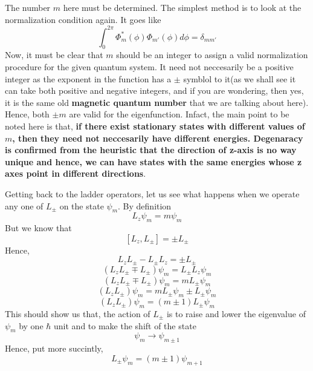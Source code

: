 \documentclass[12pt]{article}
\begin{document}
The number $m$ here must be determined. The simplest method is to look at the normalization condition again. It goes like $$\int_0^{2\pi} \Phi_m^*(\phi)\Phi_{m'}(\phi) d\phi = \delta_{mm'}$$ Now, it must be clear that $m$ should be an integer to assign a valid normalization procedure for the given quantum system. It need not neccesarily be a positive integer as the exponent in the function has a $\pm$ symblol to it(as we shall see it can take both positive and negative integers, and if you are wondering, then yes, it is the same old \textbf{magnetic quantum number} that we are talking about here). Hence, both $\pm m$ are valid for the eigenfunction. Infact, the main point to be noted here is that, \textbf{if there exist stationary states with different values of $m$, then they need not neccesarily have different energies. Degenaracy is confirmed from the heuristic that the direction of z-axis is no way unique and hence, we can have states with the same energies whose z axes point in different directions}.

Getting back to the ladder operators, let us see what happens when we operate any one of $L_{\pm}$ on the state $\psi_m$. By definition $$L_z\psi_m = m\psi_m$$ But we know that $$[L_z, L_{\pm}] = \pm L_{\pm}$$ Hence,
$$L_zL_{\pm} - L_{\pm}L_z = \pm L_{\pm}$$
$$(L_zL_{\pm} \mp L_{\pm})\psi_m = L_{\pm}L_z\psi_m$$ 
$$(L_zL_{\pm} \mp L_{\pm})\psi_m = mL_{\pm}\psi_m$$
$$(L_zL_{\pm})\psi_m  = mL_{\pm}\psi_m\pm L_{\pm}\psi_m$$
$$(L_zL_{\pm})\psi_m = (m \pm 1)L_{\pm}\psi_m$$
This should show us that, the action of $L_{\pm}$ is to raise and lower the eigenvalue of $\psi_m$ by one $\hbar$ unit and to make the shift of the state $$\psi_m \to \psi_{m \pm 1}$$ Hence, put more succintly, $$L_{\pm}\psi_m = (m \pm 1)\psi_{m+1}$$
\end{document}
